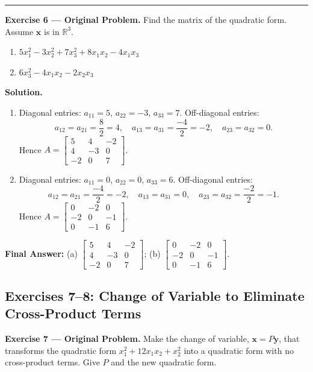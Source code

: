 \documentclass[11pt, letterpaper]{article}
\theoremstyle{definition}
\theoremstyle{remark}
\newcommand{\R}{\mathbb{R}}
\begin{document}
\medskip
\hrule
\medskip

\textbf{Exercise 6 --- Original Problem.} Find the matrix of the quadratic form. Assume $\mathbf{x}$ is in $\R^3$.
\begin{enumerate}[label=\alph*.]
    \item $5x_1^2 - 3x_2^2 + 7x_3^2 + 8x_1x_2 - 4x_1x_3$
    \item $6x_3^2 - 4x_1x_2 - 2x_2x_3$
\end{enumerate}

\textbf{Solution.}
\begin{enumerate}[label=\alph*.]
    \item Diagonal entries: $a_{11} = 5$, $a_{22} = -3$, $a_{33} = 7$. Off-diagonal entries:
    \[
    a_{12} = a_{21} = \frac{8}{2} = 4, \quad a_{13} = a_{31} = \frac{-4}{2} = -2, \quad a_{23} = a_{32} = 0.
    \]
    Hence $A = \begin{bmatrix} 5 & 4 & -2 \\ 4 & -3 & 0 \\ -2 & 0 & 7 \end{bmatrix}$.
    \item Diagonal entries: $a_{11} = 0$, $a_{22} = 0$, $a_{33} = 6$. Off-diagonal entries:
    \[
    a_{12} = a_{21} = \frac{-4}{2} = -2, \quad a_{13} = a_{31} = 0, \quad a_{23} = a_{32} = \frac{-2}{2} = -1.
    \]
    Hence $A = \begin{bmatrix} 0 & -2 & 0 \\ -2 & 0 & -1 \\ 0 & -1 & 6 \end{bmatrix}$.
\end{enumerate}

\textbf{Final Answer:} (a) $\begin{bmatrix} 5 & 4 & -2 \\ 4 & -3 & 0 \\ -2 & 0 & 7 \end{bmatrix}$; \quad (b) $\begin{bmatrix} 0 & -2 & 0 \\ -2 & 0 & -1 \\ 0 & -1 & 6 \end{bmatrix}$.

\subsection{Exercises 7--8: Change of Variable to Eliminate Cross-Product Terms}

\textbf{Exercise 7 --- Original Problem.} Make the change of variable, $\mathbf{x} = P\mathbf{y}$, that transforms the quadratic form $x_1^2 + 12x_1x_2 + x_2^2$ into a quadratic form with no cross-product terms. Give $P$ and the new quadratic form.
\end{document}
